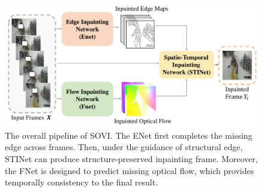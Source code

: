 \begin{figure}[t]
	\centering
	\includegraphics[width=1.0\columnwidth]{zong} %
	\caption{The overall pipeline of SOVI. The ENet first completes the missing edge across frames. Then, under the guidance of structural edge, STINet can produce structure-preserved inpainting frame. Moreover, the FNet is designed to predict missing optical flow, which provides temporally consistency to the final result.}
	\label{zong}
\end{figure}


